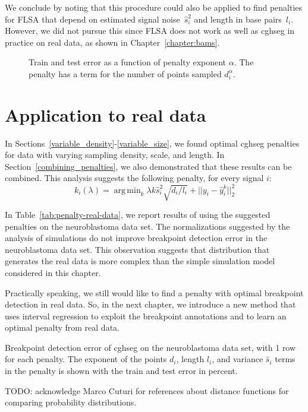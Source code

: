 \documentclass{jsfds} %
\newcommand{\fig}[3][H]{
  \begin{figure}[#1]
    \hskip -1cm
    
    \caption{#3}
    \label{fig:#2}
  \end{figure}
}
\newcommand{\tab}[3][H]{
  \begin{table}[#1]
    \centering
    
    \caption{#3}
    \label{tab:#2}
  \end{table}
}
\DeclareMathOperator*{\argmin}{arg\,min}
\begin{document}
We conclude by noting that this procedure could also be applied to
find penalties for FLSA that depend on estimated signal noise~$\hat
s_i^2$ and length in base pairs~$l_i$. However, we did not pursue this
since FLSA does not work as well as cghseg in practice on real data,
as shown in Chapter~\ref{chapter:bams}.

\fig{variable-density-error-alpha-flsa}{Train and test error as a
  function of penalty exponent $\alpha$. The penalty has a term for
  the number of points sampled $d_i^\alpha$.}


\newpage

\section{Application to real data}

In Sections~\ref{variable_density}-\ref{variable_size}, we found
optimal cghseg penalties for data with varying sampling density,
scale, and length. In Section~\ref{combining_penalties}, we also
demonstrated that these results can be combined. This analysis
suggests the following penalty, for every signal $i$:
\begin{equation}
  \label{eq:composite_penalty}
  k_i(\lambda) = 
  \argmin_k
  \lambda k \hat s_i^2 \sqrt{d_i/l_i}  +
  ||y_i - \hat y_i^k||^2_2
\end{equation}

In Table~\ref{tab:penalty-real-data}, we report results of using the
suggested penalties on the neuroblastoma data set. The normalizations
suggested by the analysis of simulations do not improve breakpoint
detection error in the neuroblastoma data set. This observation
suggests that distribution that generates the real data is more
complex than the simple simulation model considered in this chapter.

Practically speaking, we still would like to find a penalty with
optimal breakpoint detection in real data. So, in the next chapter, we
introduce a new method that uses interval regression to exploit the
breakpoint annotations and to learn an optimal penalty from real data.

\tab{penalty-real-data}{Breakpoint detection error of cghseg on the
  neuroblastoma data set, with 1 row for each penalty. The exponent of
  the points $d_i$, length $l_i$, and variance $\hat s_i$ terms in the
  penalty is shown with the train and test error in percent. }

TODO: acknowledge Marco Cuturi for references about distance functions
for comparing probability distributions.

%

\end{document}
